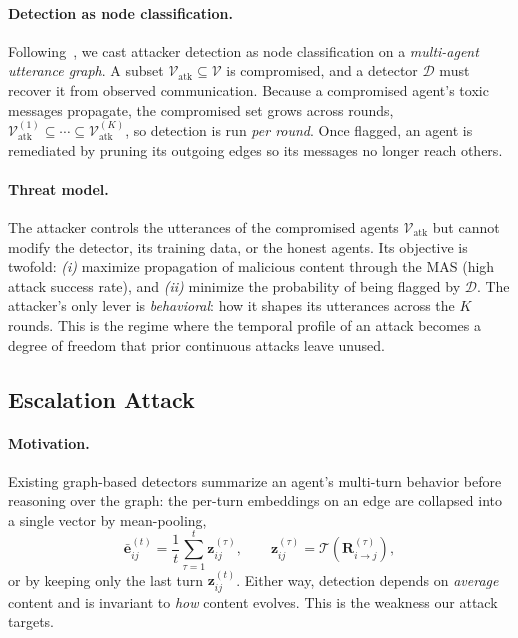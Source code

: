 \paragraph{Detection as node classification.}
Following~\citet{wang2025gsafeguard}, we cast attacker detection as node
classification on a \emph{multi-agent utterance graph}. A subset
$\mathcal{V}_{\text{atk}}\subseteq\mathcal{V}$ is compromised, and a detector
$\mathcal{D}$ must recover it from observed communication. Because a compromised
agent's toxic messages propagate, the compromised set grows across rounds,
$\mathcal{V}_{\text{atk}}^{(1)}\subseteq\cdots\subseteq\mathcal{V}_{\text{atk}}^{(K)}$,
so detection is run \emph{per round}. Once flagged, an agent is remediated by
pruning its outgoing edges so its messages no longer reach others.

\paragraph{Threat model.}
The attacker controls the utterances of the compromised agents
$\mathcal{V}_{\text{atk}}$ but cannot modify the detector, its training data, or
the honest agents. Its objective is twofold: \emph{(i)} maximize propagation of
malicious content through the MAS (high attack success rate), and \emph{(ii)}
minimize the probability of being flagged by $\mathcal{D}$. The attacker's only
lever is \emph{behavioral}: how it shapes its utterances across the $K$ rounds.
This is the regime where the temporal profile of an attack becomes a degree of
freedom that prior continuous attacks leave unused.

\subsection{Escalation Attack}
\label{sec:method_attack}

\paragraph{Motivation.}
Existing graph-based detectors summarize an agent's multi-turn behavior before
reasoning over the graph: the per-turn embeddings on an edge are collapsed into a
single vector by mean-pooling,
\begin{equation}
\label{eq:meanpool}
\bar{\mathbf{e}}_{ij}^{(t)}=\frac{1}{t}\sum_{\tau=1}^{t}\mathbf{z}_{ij}^{(\tau)},
\qquad \mathbf{z}_{ij}^{(\tau)}=\mathcal{T}\!\left(\mathbf{R}_{i\to j}^{(\tau)}\right),
\end{equation}
or by keeping only the last turn $\mathbf{z}_{ij}^{(t)}$. Either way, detection
depends on \emph{average} content and is invariant to \emph{how} content evolves.
This is the weakness our attack targets.

